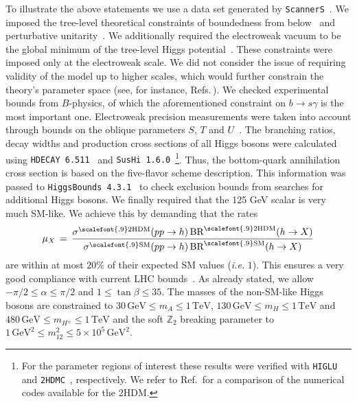 \documentclass[12pt]{article}
\newcommand{\citere}[1]{Ref.\,\cite{#1}}
\newcommand{\citeres}[1]{Refs.\,\cite{#1}}
\newcommand{\code}{\tt}
\newcommand{\sushi}[1]{{\code SusHi #1}}
\newcommand{\abbrev}{\scalefont{.9}}
\newcommand{\lhc}{{\abbrev LHC}}
\newcommand{\sm}{{\abbrev SM}}
\newcommand{\thdm}{{\abbrev 2HDM}}
\begin{document}
To illustrate the above statements we use a data set generated by {\tt ScannerS}~\cite{Coimbra:2013qq,Ferreira:2014dya,Costa:2015llh,Muhlleitner:2016mzt}.
We imposed the tree-level theoretical constraints of boundedness from below~\cite{Klimenko:1984qx,Branco:2011iw} and perturbative unitarity~\cite{Branco:2011iw}.
We additionally required the electroweak vacuum to be the global minimum of the tree-level Higgs potential~\cite{Barroso:2013awa}.
These constraints were imposed only at the electroweak scale. We did not consider the issue of requiring validity of the
model up to higher scales, which would further constrain the theory's parameter space
(see, for instance, \citeres{Chakrabarty:2014aya,Chakrabarty:2017qkh,Basler:2017nzu}).
We checked experimental bounds from $B$-physics, of which the aforementioned constraint on $b\rightarrow s\gamma$ is the most important one.
Electroweak precision measurements were taken into account through bounds on the oblique parameters $S$, $T$ and $U$~\cite{Baak:2014ora}.
The branching ratios, decay widths and production cross sections of all Higgs bosons were calculated using
{\tt HDECAY 6.511}~\cite{Djouadi:1997yw,Butterworth:2010ym} and \sushi{1.6.0}~\cite{Harlander:2012pb,Harlander:2016hcx}\footnote{For the parameter regions of interest these
results were verified with {\tt HIGLU}~\cite{Spira:1995mt} and {\tt \thdm{}C}~\cite{Eriksson:2009ws}, respectively. We refer to
\citere{Harlander:2013qxa} for a comparison of the numerical codes available for the \thdm{}.}. Thus, the bottom-quark annihilation cross section
is based on the five-flavor scheme description.
This information was  passed to
{\tt HiggsBounds 4.3.1}~\cite{Bechtle:2008jh,Bechtle:2011sb,Bechtle:2013wla,Bechtle:2015pma} to check exclusion bounds from searches for additional Higgs bosons.
We finally required that the 125 GeV scalar is very much \sm{}-like. We achieve this
by demanding that the rates
%
\begin{align}
\mu_X\,=\,\frac{\sigma^{\rm \thdm{}}(pp\to h)\,\text{BR}^{\rm \thdm{}}(h\to X)}{\sigma^{\rm \sm{}}(pp\to h)\,\text{BR}^{\rm \sm{}}(h\to X)}
\end{align}
%
are within at most $20\%$ of their expected \sm{} values ({\em i.e.} $1$). This ensures
a very good compliance with current \lhc{} bounds~\cite{Khachatryan:2016vau}.
As already stated, we allow $-\pi/2\leq \alpha \leq\pi/2$ and $1\leq \tan\beta\leq 35$.
The masses of the non-\sm{}-like Higgs bosons are constrained to $30\,\mathrm{GeV}\leq m_A\leq 1\,\mathrm{TeV}$,
$130\,\mathrm{GeV}\leq m_H\leq 1\,\mathrm{TeV}$ and $480\,\mathrm{GeV}\leq m_{H^\pm}\leq 1\,\mathrm{TeV}$
and the soft $\mathbb{Z}_2$ breaking parameter to $1\,\mathrm{GeV}^2\leq m_{12}^2\leq 5\times10^5\,\mathrm{GeV}^2$.
\end{document}
